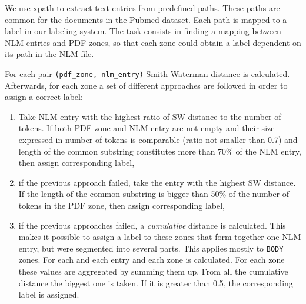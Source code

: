 We use xpath to extract text entries from predefined paths. These paths are common for the documents in the Pubmed dataset. Each path is mapped to a label in our labeling system. The task consists in finding a mapping between NLM entries and PDF zones, so that each zone could obtain a label dependent on its path in the NLM file.

For each pair \verb+(pdf_zone, nlm_entry)+ Smith-Waterman distance
is calculated. Afterwards, for each zone a set of different approaches are followed in order to assign a correct label:
\begin{enumerate}
\item Take NLM entry with the highest ratio of SW distance to the number of tokens. If both PDF zone and NLM entry are not empty and their size expressed in number of tokens is comparable (ratio not smaller than 0.7) and length of the common substring constitutes more than 70\% of the NLM entry, then assign corresponding label,
\item if the previous approach failed, take the entry with the highest SW distance. If the length of the common substring is bigger than 50\% of the number of tokens in the PDF zone, then assign corresponding label,
\item if the previous approaches failed, a \textit{cumulative} distance is calculated. This makes it possible to assign a label to these zones that form together one NLM entry, but were segmented into several parts. This applies mostly to \verb+BODY+ zones. For each and each entry and each zone is calculated. For each zone these values are aggregated by summing them up. From all the cumulative distance the biggest one is taken. If it is greater than 0.5, the corresponding label is assigned.
\end{enumerate}
